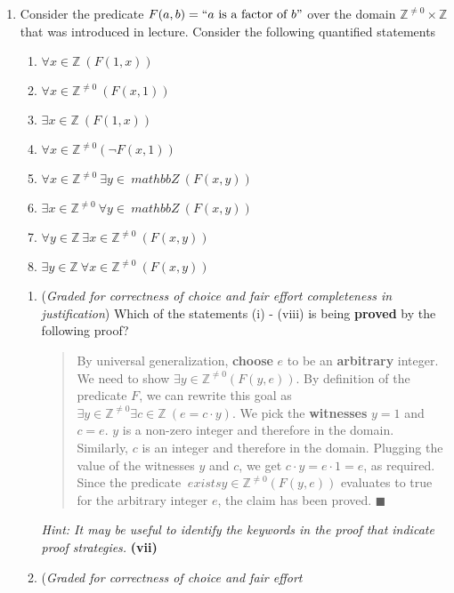 \documentclass[12pt, oneside]{article}
\begin{document}
\begin{enumerate}
\item Consider the predicate $F(a,b) = ``a \text{ is a factor
of } b"$ over the domain $\mathbb{Z}^{\neq 0} \times \mathbb{Z}$
that was introduced in lecture. Consider the following quantified
statements
\label{factoring}
\begin{multicols}{2}
\begin{enumerate}[label=(\roman*)]
\item $\forall x \in \mathbb{Z} ~(F(1,x))$
\item $\forall x \in \mathbb{Z}^{\neq 0} ~(F(x,1))$
\item $\exists x \in \mathbb{Z} ~(F(1,x))$
\item $\forall x \in \mathbb{Z}^{\ne 0} ( \neg F(x,1))$
\item $\forall x \in \mathbb{Z}^{\neq 0} ~\exists y \in \
mathbb{Z} ~(F(x,y))$
\item $\exists x \in \mathbb{Z}^{\neq 0} ~\forall y \in \
mathbb{Z} ~(F(x,y))$
\item $\forall y \in \mathbb{Z} ~\exists x \in \mathbb{Z}^{\neq
0} ~(F(x,y))$
\item $\exists y \in \mathbb{Z} ~\forall x \in \mathbb{Z}^{\neq
0} ~(F(x,y))$
\end{enumerate}
\end{multicols}
\begin{enumerate}
\item ({\it Graded for correctness of choice and fair effort
completeness in justification})
Which of the statements (i) - (viii) is being {\bf proved} by the
following proof?
\begin{quote}
By universal generalization, {\bf choose} $e$ to be an {\bf
arbitrary} integer.
We need to show $\exists y \in \mathbb{Z}^{\neq 0} (F(y,e))$. By
definition of the predicate $F$, we can rewrite
this goal as $\exists y \in \mathbb{Z}^{\neq 0} \exists c \in
\mathbb{Z}~(e = c \cdot y)$. We pick the {\bf witnesses} $y = 1$
and $c = e$. $y$ is a non-zero integer and therefore in the
domain. Similarly, $c$ is an integer and therefore in the domain.
Plugging the value of the witnesses $y$ and $c$, we get
$c \cdot y = e \cdot 1 = e$, as required. Since the predicate $\
exists y \in \mathbb{Z}^{\neq 0} (F(y,e))$ evaluates to true
for the arbitrary integer $e$, the claim has been proved.
\hfill $\blacksquare$
\end{quote}
{\it Hint: It may be useful to
identify the keywords in the proof that indicate proof
strategies.}
\newline \textbf{(vii)}
\item ({\it Graded for correctness of choice and fair effort
}
\end{enumerate}
\end{enumerate}
\end{document}
